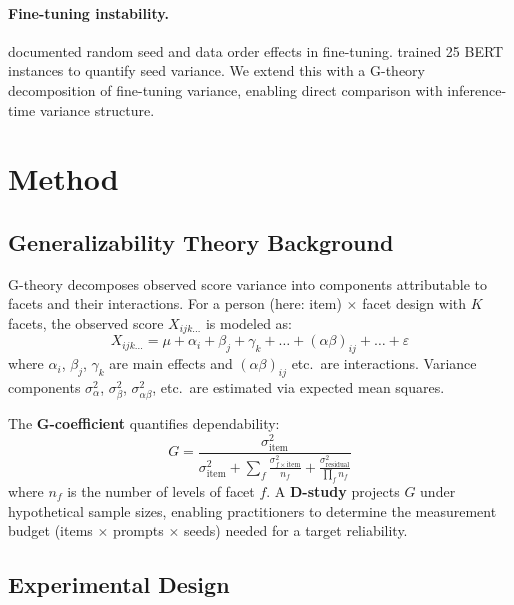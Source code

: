 \documentclass[11pt,letterpaper]{article}
\begin{document}
\paragraph{Fine-tuning instability.}
\citet{dodge2020finetuning} documented random seed and data order effects in fine-tuning.
\citet{sellam2022multiberts} trained 25 BERT instances to quantify seed variance.
We extend this with a G-theory decomposition of fine-tuning variance, enabling direct comparison with inference-time variance structure.

\section{Method}

\subsection{Generalizability Theory Background}

G-theory decomposes observed score variance into components attributable to facets and their interactions.
For a person (here: item) $\times$ facet design with $K$ facets, the observed score $X_{ijk\ldots}$ is modeled as:
\begin{equation}
X_{ijk\ldots} = \mu + \alpha_i + \beta_j + \gamma_k + \ldots + (\alpha\beta)_{ij} + \ldots + \varepsilon
\end{equation}
where $\alpha_i$, $\beta_j$, $\gamma_k$ are main effects and $(\alpha\beta)_{ij}$ etc.\ are interactions.
Variance components $\sigma^2_\alpha$, $\sigma^2_\beta$, $\sigma^2_{\alpha\beta}$, etc.\ are estimated via expected mean squares.

The \textbf{G-coefficient} quantifies dependability:
\begin{equation}
G = \frac{\sigma^2_\text{item}}{\sigma^2_\text{item} + \sum_{f} \frac{\sigma^2_{f \times \text{item}}}{n_f} + \frac{\sigma^2_\text{residual}}{\prod_f n_f}}
\end{equation}
where $n_f$ is the number of levels of facet $f$.
A \textbf{D-study} projects $G$ under hypothetical sample sizes, enabling practitioners to determine the measurement budget (items $\times$ prompts $\times$ seeds) needed for a target reliability.

\subsection{Experimental Design}
\end{document}
